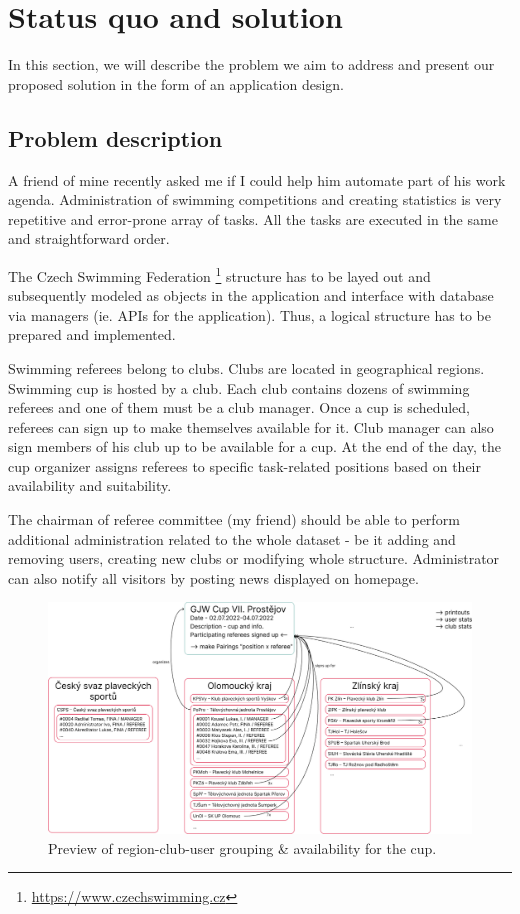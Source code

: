 \chapter{Status quo and solution}
In this section, we will describe the problem we aim to address and present our proposed solution in the form of an application design.
\section{Problem description}
\par
A friend of mine recently asked me if I could help him automate part of his work agenda. Administration of swimming competitions and creating statistics is very repetitive and error-prone array of tasks. All the tasks are executed in the same and straightforward order. \par
The Czech Swimming Federation \footnote{\url{https://www.czechswimming.cz}} structure has to be layed out and subsequently modeled as objects in the application and interface with database via managers (ie. APIs for the application). Thus, a logical structure has to be prepared and implemented. \par
Swimming referees belong to clubs. Clubs are located in geographical regions. Swimming cup is hosted by a club. Each club contains dozens of swimming referees and one of them must be a club manager. Once a cup is scheduled, referees can sign up to make themselves available for it. Club manager can also sign members of his club up to be available for a cup. At the end of the day, the cup organizer assigns referees to specific task-related positions based on their availability and suitability. \par
The chairman of referee committee (my friend) should be able to perform additional administration related to the whole dataset - be it adding and removing users, creating new clubs or modifying whole structure. Administrator can also notify all visitors by posting news displayed on homepage. \par
\begin{figure}[h]
  \centering	
  \includegraphics[scale=0.265]{img/swimmpair_schema.png}
  \caption{Preview of region-club-user grouping \& availability for the cup.}
  \label{fig1.1:grouping}
\end{figure}
